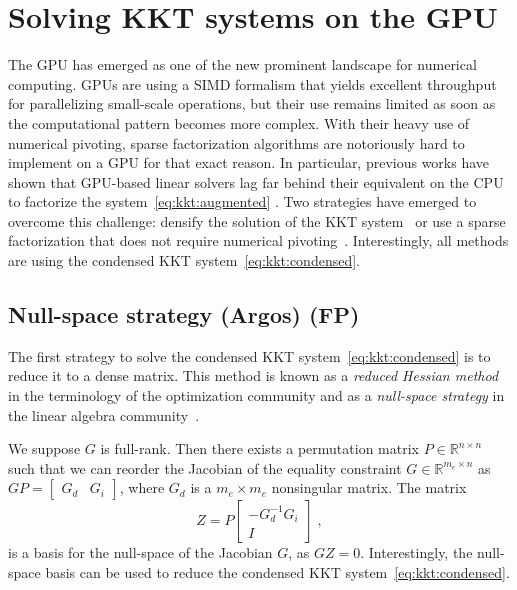 \section{Solving KKT systems on the GPU}
The GPU has emerged as one of the new prominent landscape
for numerical computing. GPUs are using a SIMD formalism
that yields excellent throughput for parallelizing small-scale
operations, but their use remains limited as soon as the computational
pattern becomes more complex. With their heavy use of numerical
pivoting, sparse factorization algorithms are notoriously hard to implement
on a GPU for that exact reason. In particular, previous works have
shown that GPU-based linear solvers lag far behind their equivalent
on the CPU to factorize the system~\eqref{eq:kkt:augmented}
\cite{tasseff2019exploring,swirydowicz2021linear}. Two strategies
have emerged to overcome this challenge: densify the solution
of the KKT system~\cite{pacaud2022condensed} or use a sparse factorization that
does not require numerical pivoting~\cite{regev2023hykkt,shin2023accelerating}.
Interestingly, all methods are using the condensed KKT system~\eqref{eq:kkt:condensed}.

\subsection{Null-space strategy (Argos) (FP)}
The first strategy to solve the condensed KKT system~\eqref{eq:kkt:condensed}
is to reduce it to a dense matrix. This
method is known as a \emph{reduced Hessian method} in the
terminology of the optimization community \cite{biegler1995reduced}
and as a \emph{null-space strategy} in the linear algebra
community~\cite[Section 6]{benzi2005numerical}.

We suppose $G$ is full-rank.
Then there exists a permutation matrix $P \in \mathbb{R}^{n \times n}$
such that we can reorder the Jacobian of the equality constraint
$G \in \mathbb{R}^{m_e \times n}$ as $GP = \begin{bmatrix}
  G_d & G_i
\end{bmatrix}$, where $G_d$ is a $m_e \times m_e$ nonsingular matrix.
The matrix
\begin{equation}
  \label{eq:nullspace}
  Z = P \begin{bmatrix}
    - G_d^{-1} G_i \\ I
  \end{bmatrix} \; ,
\end{equation}
is a basis for the null-space of the Jacobian $G$, as $GZ = 0$.
Interestingly, the null-space basis can be used to reduce the condensed
KKT system~\eqref{eq:kkt:condensed}.

